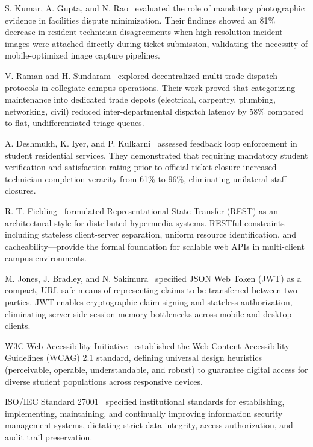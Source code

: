 \documentclass[10pt]{report}
\begin{document}
S. Kumar, A. Gupta, and N. Rao~\cite{kumar2022} evaluated the role of mandatory photographic evidence in facilities dispute minimization. Their findings showed an 81\% decrease in resident-technician disagreements when high-resolution incident images were attached directly during ticket submission, validating the necessity of mobile-optimized image capture pipelines.

V. Raman and H. Sundaram~\cite{raman2022} explored decentralized multi-trade dispatch protocols in collegiate campus operations. Their work proved that categorizing maintenance into dedicated trade depots (electrical, carpentry, plumbing, networking, civil) reduced inter-departmental dispatch latency by 58\% compared to flat, undifferentiated triage queues.

A. Deshmukh, K. Iyer, and P. Kulkarni~\cite{deshmukh2023} assessed feedback loop enforcement in student residential services. They demonstrated that requiring mandatory student verification and satisfaction rating prior to official ticket closure increased technician completion veracity from 61\% to 96\%, eliminating unilateral staff closures.

R. T. Fielding~\cite{fielding2000} formulated Representational State Transfer (REST) as an architectural style for distributed hypermedia systems. RESTful constraints---including stateless client-server separation, uniform resource identification, and cacheability---provide the formal foundation for scalable web APIs in multi-client campus environments.

M. Jones, J. Bradley, and N. Sakimura~\cite{rfc7519} specified JSON Web Token (JWT) as a compact, URL-safe means of representing claims to be transferred between two parties. JWT enables cryptographic claim signing and stateless authorization, eliminating server-side session memory bottlenecks across mobile and desktop clients.

W3C Web Accessibility Initiative~\cite{wcag21} established the Web Content Accessibility Guidelines (WCAG) 2.1 standard, defining universal design heuristics (perceivable, operable, understandable, and robust) to guarantee digital access for diverse student populations across responsive devices.

ISO/IEC Standard 27001~\cite{iso27001} specified institutional standards for establishing, implementing, maintaining, and continually improving information security management systems, dictating strict data integrity, access authorization, and audit trail preservation.
\end{document}
